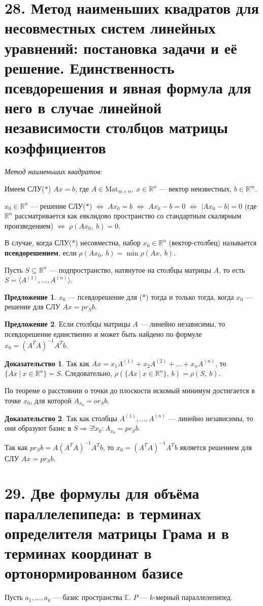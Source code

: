 \documentclass[a4paper, 12pt]{article}
\newcommand{\E}{\mathbb{E}}
\newcommand{\R}{\mathbb{R}}
\begin{document}
\section*{28. Метод наименьших квадратов для несовместных систем линейных уравнений: постановка задачи и её решение. Единственность псевдорешения и явная формула для него в случае линейной независимости столбцов матрицы коэффициентов}
\textit{Метод наименьших квадратов}:

Имеем СЛУ($*$) $Ax = b$, где $A \in \text{Mat}_{m \times n},\ x \in \R^n$ --- вектор неизвестных, $b \in \R^m$.

$x_0 \in \R^n$ --- решение СЛУ($*$) $\Leftrightarrow$ $Ax_0 = b$ $\Leftrightarrow$ $Ax_0 - b = 0$ $\Leftrightarrow$ $|Ax_0 - b| = 0$ (где $\R^n$ рассматривается как евклидово пространство со стандартным скалярным произведением) $\Leftrightarrow$ $\rho(Ax_0,\ b) = 0$.

В случае, когда СЛУ(*) несовместна, набор $x_0 \in \R^n$ (вектор-столбец) называется \textbf{псевдорешением}, если $\rho(Ax_0,\ b) = \min\rho(Ax,\ b)$.

\vspace{5mm}
Пусть $S \subseteq \R^n$ --- подпространство, натянутое на столбцы матрицы $A$, то есть $S = \langle A^{(1)}, \ldots, A^{(n)} \rangle$.

\textbf{Предложение 1}. $x_0$ --- псевдорешение для ($*$) тогда и только тогда, когда $x_0$ --- решение для СЛУ $Ax = pr_Sb$.

\textbf{Предложение 2}. Если столбцы матрицы $A$ --- линейно независимы, то псевдорешение единственно и может быть найдено по формуле $x_0 = (A^TA)^{-1}A^Tb$.

\vspace{5mm}
\textbf{Доказательство 1}. Так как $Ax = x_1A^{(1)} + x_2A^{(2)} + \ldots + x_nA^{(n)}$, то $\{Ax\ |\ x  \in \R^n\} = S$. Следовательно, $\rho(\{Ax\ |\ x \in \R^n\},\ b) = \rho(S,\ b)$.

По теореме о расстоянии о точки до плоскости искомый минимум достигается в точке $x_0$, для которой $A_{x_0} = or_Sb$.

\textbf{Доказательство 2}. Так как столбцы $A^{(1)}, \ldots, A^{(n)}$ --- линейно независимы, то они образуют базис в $S \Longrightarrow \exists! x_0: A_{x_0} = pr_Sb$.

Так как $pr_Sb = A(A^TA)^{-1}A^Tb$, то $x_0 = (A^TA)^{-1}A^Tb$ является решением для СЛУ $Ax = pr_Sb$.

\section*{29. Две формулы для объёма параллелепипеда: в терминах определителя матрицы Грама и в терминах координат в ортонормированном базисе}
Пусть $a_1, \ldots, a_k$ --- базис пространства $\E$. $P$ --- $k$-мерный параллелепипед.
\end{document}
